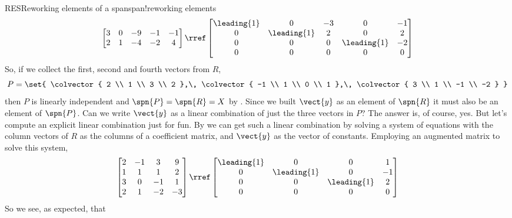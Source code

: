 \begin{example}{RES}{Reworking elements of a span}{span!reworking elements}
\begin{equation*}
\begin{bmatrix}
 3 & 0 & -9 & -1 & -1 \\
 2 & 1 & -4 & -2 & 4
\end{bmatrix}
\rref
\begin{bmatrix}
 \leading{1} & 0 & -3 & 0 & -1 \\
 0 & \leading{1} & 2 & 0 & 2 \\
 0 & 0 & 0 & \leading{1} & -2 \\
 0 & 0 & 0 & 0 & 0
\end{bmatrix}
\end{equation*}
%
So, if we collect the first, second and fourth vectors from $R$,
%
\begin{equation*}
P=\set{
\colvector{ 2 \\ 1 \\ 3 \\ 2 },\,
\colvector{ -1 \\ 1 \\ 0 \\ 1 },\,
\colvector{ 3 \\ 1 \\ -1 \\ -2 }
}\end{equation*}
%
then $P$ is linearly independent and $\spn{P}=\spn{R}=X$ by .  Since we built $\vect{y}$ as an element of $\spn{R}$ it must also be an element of $\spn{P}$.  Can we write $\vect{y}$ as a linear combination of just the three vectors in $P$?  The answer is, of course, yes.  But let's compute an explicit linear combination just for fun.  By  we can get such a linear combination by solving a system of equations with the column vectors of $R$ as the columns of a coefficient matrix, and $\vect{y}$ as the vector of constants.  Employing an augmented matrix to solve this system, 
%
\begin{equation*}
\begin{bmatrix}
 2 & -1 & 3 & 9 \\
 1 & 1 & 1 & 2 \\
 3 & 0 & -1 & 1 \\
 2 & 1 & -2 & -3
\end{bmatrix}
\rref
\begin{bmatrix}
 \leading{1} & 0  & 0 & 1 \\
 0 & \leading{1} & 0 & -1 \\
 0 & 0 & \leading{1} & 2 \\
 0 & 0 & 0 & 0
\end{bmatrix}
\end{equation*}
%
So we see, as expected, that 

\end{example}

